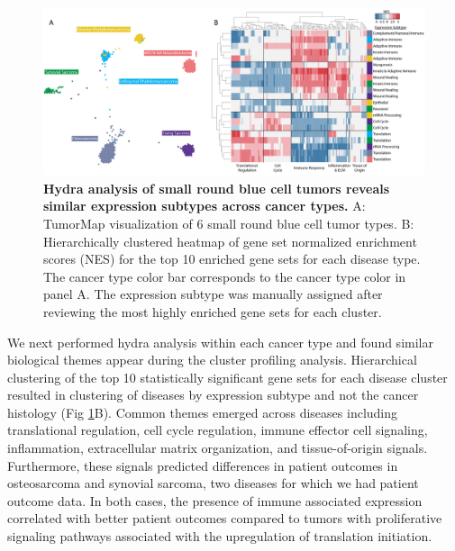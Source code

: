 \documentclass[10pt,letterpaper]{article}
\begin{document}
\begin{figure}[!h]
	\includegraphics[width=1.05\textwidth]{img/hydra-pan-small-round-blue-V2-2x}
	\caption{{\bf Hydra analysis of small round blue cell tumors reveals similar expression subtypes across cancer types.} A: TumorMap visualization of 6 small round blue cell tumor types. B: Hierarchically clustered heatmap of gene set normalized enrichment scores (NES) for the top 10 enriched gene sets for each disease type. The cancer type color bar corresponds to the cancer type color in panel A. The expression subtype was manually assigned after reviewing the most highly enriched gene sets for each cluster.}
	\label{pancan}
\end{figure}

We next performed hydra analysis within each cancer type and found similar biological themes appear during the cluster profiling analysis. Hierarchical clustering of the top 10 statistically significant gene sets for each disease cluster resulted in clustering of diseases by expression subtype and not the cancer histology (Fig \ref{pancan}B). Common themes emerged across diseases including translational regulation, cell cycle regulation, immune effector cell signaling, inflammation, extracellular matrix organization, and tissue-of-origin signals. Furthermore, these signals predicted differences in patient outcomes in osteosarcoma and synovial sarcoma, two diseases for which we had patient outcome data. In both cases, the presence of immune associated expression correlated with better patient outcomes compared to tumors with proliferative signaling pathways associated with the upregulation of translation initiation.
\end{document}
